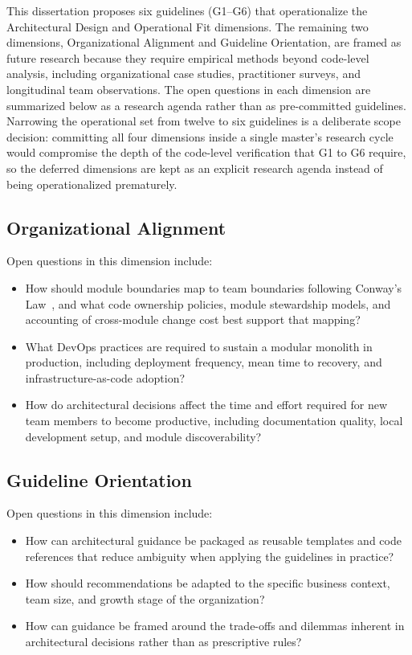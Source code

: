 This dissertation proposes six guidelines (G1--G6) that operationalize the Architectural Design and Operational Fit dimensions. The remaining two dimensions, Organizational Alignment and Guideline Orientation, are framed as future research because they require empirical methods beyond code-level analysis, including organizational case studies, practitioner surveys, and longitudinal team observations. The open questions in each dimension are summarized below as a research agenda rather than as pre-committed guidelines. Narrowing the operational set from twelve to six guidelines is a deliberate scope decision: committing all four dimensions inside a single master's research cycle would compromise the depth of the code-level verification that G1 to G6 require, so the deferred dimensions are kept as an explicit research agenda instead of being operationalized prematurely.

\subsection*{Organizational Alignment}

Open questions in this dimension include:

\begin{itemize}[itemsep=8pt,topsep=2pt]
  \item How should module boundaries map to team boundaries following Conway's Law~\cite{fowler2003}, and what code ownership policies, module stewardship models, and accounting of cross-module change cost best support that mapping?
  \item What DevOps practices are required to sustain a modular monolith in production, including deployment frequency, mean time to recovery, and infrastructure-as-code adoption?
  \item How do architectural decisions affect the time and effort required for new team members to become productive, including documentation quality, local development setup, and module discoverability?
\end{itemize}

\subsection*{Guideline Orientation}

Open questions in this dimension include:

\begin{itemize}[itemsep=8pt,topsep=2pt]
  \item How can architectural guidance be packaged as reusable templates and code references that reduce ambiguity when applying the guidelines in practice?
  \item How should recommendations be adapted to the specific business context, team size, and growth stage of the organization?
  \item How can guidance be framed around the trade-offs and dilemmas inherent in architectural decisions rather than as prescriptive rules?
\end{itemize}

